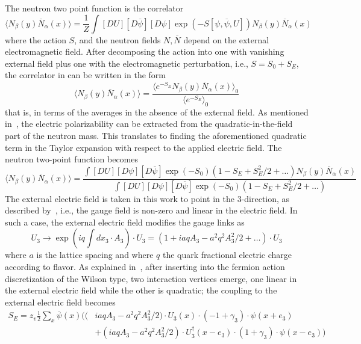 The neutron two point function is the correlator
\begin{equation}
\langle N_{\beta}(y)\overline N_{\alpha}(x)\rangle= \frac{1}{Z}\int[DU][D\overline \psi][D\psi]
\exp(-S[\psi,\overline \psi, U])N_{\beta}(y)\overline N_{\alpha}(x)
\label{correlator}
\end{equation}
where the action $S$, and the neutron fields $N, \overline N$ depend on the external
electromagnetic field. After decomposing the action into one with vanishing external field
plus one with the electromagnetic perturbation, i.e., $S=S_0+S_E$, the correlator in
 can be written in the form
\begin{equation}
\langle N_{\beta}(y)\overline N_{\alpha}(x)\rangle=\frac{\langle e^{-S_E}N_{\beta}(y)\overline N_{\alpha}(x)\rangle_0}
{\langle e^{-S_E}\rangle_0}
\end{equation}
that is, in terms of the averages in the absence of the external field.
As mentioned in~, the electric polarizability can be extracted from
the quadratic-in-the-field part of the neutron mass. This translates to finding the
aforementioned quadratic term in the Taylor expansion with respect to the applied
electric field. The neutron two-point function becomes
\begin{equation}
\langle N_{\beta}(y)\overline N_{\alpha}(x)\rangle=
\frac{\int[DU][D\psi][D\overline \psi]\exp(-S_0)(1-S_E+S_E^2/2+\dots)N_{\beta}(y)\overline N_{\alpha}(x)}{\int [DU][D\psi][D\overline \psi]\exp(-S_0)(1-S_E+S_E^2/2+\dots)}
\end{equation}
The external electric field is taken in this work to point in the 3-direction, as 
described by~, i.e., the gauge field is non-zero and linear in the electric field.
In such a case, the external electric field modifies the gauge links as
\begin{equation}
U_3\rightarrow\exp\left(iq\int dx_3\cdot A_3\right)\cdot U_3=(1+iaqA_3-a^2q^2A_3^2/2+\dots)\cdot U_3
\label{gaugelink}
\end{equation}
where $a$ is the lattice spacing and where $q$ the quark fractional electric charge
according to flavor. As explained in~\cite{Engelhardt:2009ryp}, after inserting  into
the fermion action discretization of the Wilson type, two interaction vertices emerge, one
linear in the external electric field while the other is quadratic; the coupling to the
external electric field becomes
\begin{equation}
\begin{split}
S_E=z_v\frac{1}{2}\sum_x \overline{\psi}(x)((&iaqA_3-a^2q^2A_3^2/2)\cdot U_3(x)\cdot
(-1+\gamma_3)\cdot \psi(x+e_3)\\
&+(iaqA_3-a^2q^2A_3^2/2)\cdot U_3^\dagger(x-e_3)\cdot(1+\gamma_3)\cdot\psi(x-e_3))
\end{split}
\label{interaction}
\end{equation}
